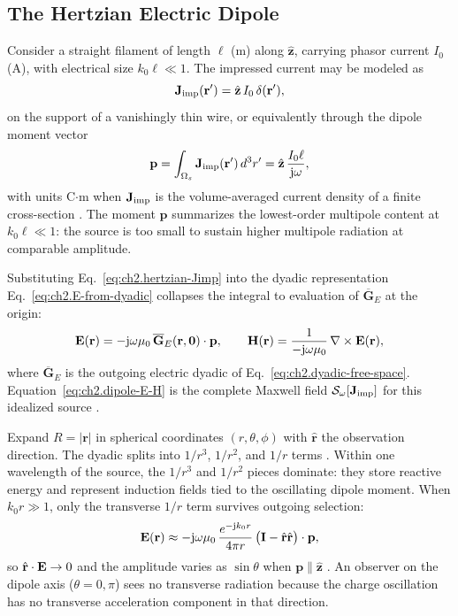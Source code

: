 
\subsection{The Hertzian Electric Dipole}
\label{sec:ch02.5.4}

Consider a straight filament of length $\ell$ (m) along $\hat{\mathbf{z}}$, carrying phasor current $I_0$ (A), with electrical size $k_0\ell\ll1$. The impressed current may be modeled as
\begin{equation}
\label{eq:ch2.hertzian-Jimp}
\mathbf{J}_{\mathrm{imp}}(\mathbf{r}')=\hat{\mathbf{z}}\,I_0\,\delta(\mathbf{r}'),
\end{equation}
on the support of a vanishingly thin wire, or equivalently through the dipole moment vector
\begin{equation}
\label{eq:ch2.dipole-moment}
\mathbf{p}=\int_{\Omega_s}\mathbf{J}_{\mathrm{imp}}(\mathbf{r}')\,d^3r'=\hat{\mathbf{z}}\,\frac{I_0\ell}{\mathrm{j}\omega},
\end{equation}
with units C$\cdot$m when $\mathbf{J}_{\mathrm{imp}}$ is the volume-averaged current density of a finite cross-section \cite{jackson1999,stratton1941}. The moment $\mathbf{p}$ summarizes the lowest-order multipole content at $k_0\ell\ll1$: the source is too small to sustain higher multipole radiation at comparable amplitude.

Substituting Eq.~\eqref{eq:ch2.hertzian-Jimp} into the dyadic representation Eq.~\eqref{eq:ch2.E-from-dyadic} collapses the integral to evaluation of $\overline{\mathbf{G}}_{E}$ at the origin:
\begin{equation}
\label{eq:ch2.dipole-E-H}
\mathbf{E}(\mathbf{r})=-\mathrm{j}\omega\mu_0\,\overline{\mathbf{G}}_{E}(\mathbf{r},\mathbf{0})\cdot\mathbf{p},
\qquad
\mathbf{H}(\mathbf{r})=\frac{1}{-\mathrm{j}\omega\mu_0}\,\nabla\times\mathbf{E}(\mathbf{r}),
\end{equation}
where $\overline{\mathbf{G}}_{E}$ is the outgoing electric dyadic of Eq.~\eqref{eq:ch2.dyadic-free-space}. Equation~\eqref{eq:ch2.dipole-E-H} is the complete Maxwell field $\mathcal{S}_\omega[\mathbf{J}_{\mathrm{imp}}]$ for this idealized source \cite{stratton1941}.

Expand $R=|\mathbf{r}|$ in spherical coordinates $(r,\theta,\phi)$ with $\hat{\mathbf{r}}$ the observation direction. The dyadic splits into $1/r^3$, $1/r^2$, and $1/r$ terms \cite{jackson1999}. Within one wavelength of the source, the $1/r^3$ and $1/r^2$ pieces dominate: they store reactive energy and represent induction fields tied to the oscillating dipole moment. When $k_0 r\gg1$, only the transverse $1/r$ term survives outgoing selection:
\begin{equation}
\label{eq:ch2.dipole-far-E}
\mathbf{E}(\mathbf{r})\approx
-\mathrm{j}\omega\mu_0\,\frac{e^{-\mathrm{j} k_0 r}}{4\pi r}\,
\big(\mathbf{I}-\hat{\mathbf{r}}\hat{\mathbf{r}}\big)\cdot\mathbf{p},
\end{equation}
so $\hat{\mathbf{r}}\cdot\mathbf{E}\to0$ and the amplitude varies as $\sin\theta$ when $\mathbf{p}\parallel\hat{\mathbf{z}}$ \cite{stratton1941}. An observer on the dipole axis ($\theta=0,\pi$) sees no transverse radiation because the charge oscillation has no transverse acceleration component in that direction.

